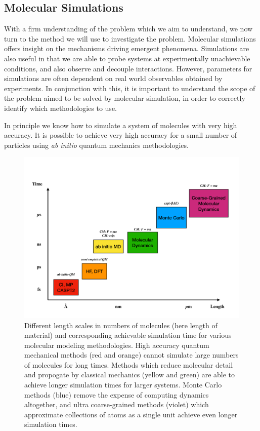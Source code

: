 \subsection{Molecular Simulations}
With a firm understanding of the problem which we aim to understand,
we now turn to the method we will use to investigate the
problem. Molecular simulations offers insight on the mechanisms
driving emergent phenomena. Simulations are also useful in that we are
able to probe systems at experimentally unachievable conditions, and
also observe and decouple interactions. However, parameters for
simulations are often dependent on real world observables obtained by
experiments. In conjunction with this, it is important to understand
the scope of the problem aimed to be solved by molecular simulation,
in order to correctly identify which methodologies to use. 

In principle we know how to simulate a system of molecules with very
high accuracy. 
It is possible to achieve very high accuracy for a small number of
particles using \textit{ab initio} quantum mechanics methodologies. 




\begin{figure}
\includegraphics[width=\linewidth]{Figures/SimulationScale}
\caption{\label{fig:SimulationScale} Different length scales in
  numbers of molecules (here length of material) and corresponding
  achievable simulation time for various molecular modeling
  methodologies. High accuracy quantum mechanical methods (red and
  orange) cannot simulate large numbers of molecules for long
  times. Methods which reduce molecular detail and propogate by
  classical mechanics (yellow and green) are able to achieve longer
  simulation times for larger systems. Monte Carlo methods (blue)
  remove the expense of computing dynamics altogether, and ultra
  coarse-grained methods (violet) which approximate collections of
  atoms as a single unit achieve even longer simulation times.}
\end{figure}



